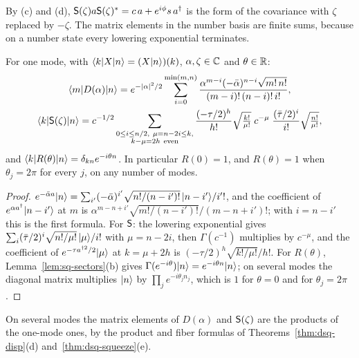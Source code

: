 \begin{veteenv}
By (c) and (d), $\mathsf S(\zeta)a\mathsf S(\zeta)^*=c\,a+e^{i\phi}s\,a^\dagger$ is the form of the covariance with $\zeta$ replaced by $-\zeta$.
The matrix elements in the number basis are finite sums, because on a number state every lowering exponential terminates.

\begin{lemma}\label{lem:dsq-matrix}
For one mode, with $\langle k\rvert X\lvert n\rangle=(X\lvert n\rangle)(k)$, $\alpha,\zeta\in\mathbb C$ and $\theta\in\mathbb R$:
\begin{gather*}
 \langle m\rvert D(\alpha)\ket n=e^{-\lvert\alpha\rvert^2/2}\sum_{i=0}^{\min(m,n)}\frac{\alpha^{m-i}(-\bar\alpha)^{n-i}\sqrt{m!\,n!}}
 {(m-i)!\,(n-i)!\,i!},\\
 \langle k\rvert\sS(\zeta)\ket n=c^{-1/2}\sum_{\substack{0\le i\le n/2,\ \mu=n-2i\le k,\\ k-\mu=2h\ \text{even}}}\frac{(-\tau/2)^h}{h!}
 \sqrt{\tfrac{k!}{\mu!}}\;c^{-\mu}\;\frac{(\bar\tau/2)^i}{i!}\sqrt{\tfrac{n!}{\mu!}},
\end{gather*}
and $\langle k\rvert R(\theta)\lvert n\rangle=\delta_{kn}e^{-i\theta n}$. In particular $R(0)=1$, and $R(\theta)=1$ when $\theta_j=2\pi$ for
every $j$, on any number of modes.
\end{lemma}

\begin{proof}
$e^{-\bar\alpha a}\lvert n\rangle=\sum_{i'}(-\bar\alpha)^{i'}\sqrt{n!/(n-i')!}\,\lvert n-i'\rangle/i'!$, and the coefficient of $e^{\alpha a^\dagger}\lvert n-i'\rangle$ at
$m$ is $\alpha^{m-n+i'}\sqrt{m!/(n-i')!}/(m-n+i')!$; with $i=n-i'$ this is the first formula. For $\mathsf S$: the lowering exponential
gives $\sum_i(\bar\tau/2)^i\sqrt{n!/\mu!}\,\lvert \mu\rangle/i!$ with $\mu=n-2i$, then $\Gamma(c^{-1})$ multiplies by $c^{-\mu}$, and the
coefficient of $e^{-\tau a^{\dagger2}/2}\lvert \mu\rangle$ at $k=\mu+2h$ is $(-\tau/2)^h\sqrt{k!/\mu!}/h!$. For $R(\theta)$,
Lemma~\ref{lem:sq-sectors}(b) gives $\Gamma(e^{-i\theta})\lvert n\rangle=e^{-i\theta n}\lvert n\rangle$; on several modes the diagonal matrix
multiplies $\lvert n\rangle$ by $\prod_je^{-i\theta_jn_j}$, which is $1$ for $\theta=0$ and for $\theta_j=2\pi$.
\end{proof}

On several modes the matrix elements of $D(\alpha)$ and $\mathsf S(\zeta)$ are the products of the one-mode ones, by the product
and fiber formulas of Theorems~\ref{thm:dsq-disp}(d) and~\ref{thm:dsq-squeeze}(e). 


\end{veteenv}
